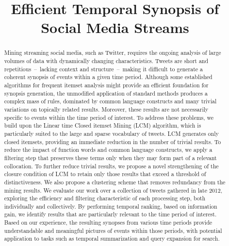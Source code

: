 \documentclass{sig-alternate}
\begin{document}
\title{Efficient Temporal Synopsis of Social Media Streams}

\maketitle
\begin{abstract}


Mining
streaming social media, such as Twitter, requires the ongoing analysis of large volumes of data with dynamically changing characteristics.  Tweets are short and repetitious~--~lacking context and structure~--~making it difficult to generate a coherent synopsis of events within a given time period.  Although some established algorithms for frequent itemset analysis might provide an efficient foundation for synopsis generation, the unmodified application of standard methods produces a complex mass of rules, dominated by common language constructs and many trivial variations on topically related results.  Moreover, these results are not necessarily specific to events within the time period of interest.  To address these problems, we build upon the Linear time Closed itemset Mining (LCM) algorithm, which is particularly suited to the large and sparse vocabulary of tweets.  LCM generates only closed itemsets, providing an immediate reduction in the number of trivial results.  To reduce the impact of function words and common language constructs, we apply a filtering step that preserves these terms only when they may form part of a relevant collocation.  To further reduce trivial results, we propose a novel strengthening of the closure condition of LCM to retain only those results that exceed a threshold of distinctiveness.  
We also propose a clustering scheme that removes redundancy from
the mining results.
We evaluate our work over a collection of tweets gathered in late 2012, exploring the efficiency and filtering characteristic of each processing step, both individually and collectively.  
By performing temporal ranking, based on information gain, we identify results that are particularly relevant to the time period of interest.
Based on our experience, the resulting synopses from various time periods provide understandable and meaningful pictures of events within those periods, with potential application to tasks such as temporal summarization and query expansion for search.
\end{abstract}
\end{document}
